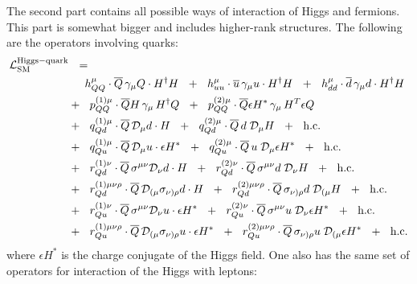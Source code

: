 \documentclass[12pt,preprintnumbers,nofootinbib]{revtex4}
\newcommand{\ov}{\overline}
\newcommand{\md}{\mathcal{D}}
\begin{document}
	The second part contains all possible ways of interaction of
	Higgs and fermions. 
	This part is somewhat bigger and includes higher-rank structures.
	The following are the operators involving quarks:
\begin{align}
\notag
	\mathcal{L}_{\rm SM}^{\rm Higgs-quark} & ~~=~~
	\\
\notag
	&
	\phantom{+~~}
	h_{QQ}^\mu \cdot
	\ov{Q}\, \gamma_\mu Q \cdot H^\dag H ~~+~~
	h_{uu}^\mu \cdot
	\ov{u}\, \gamma_\mu u \cdot H^\dag H ~~+~~
	h_{dd}^\mu \cdot
	\ov{d}\, \gamma_\mu d \cdot H^\dag H 
	\\
\notag
	&
	+~~
	p^{(1)\mu}_{QQ} \cdot
	\ov{Q}H \, \gamma_\mu\, H^\dag Q ~~+~~
	p^{(2)\mu}_{QQ} \cdot
	\ov{Q}\epsilon H^* \, \gamma_\mu \, H^T \epsilon Q 
	\\
\notag
	&
	+~~
	q^{(1)\mu}_{Qd} \cdot
	\ov{Q}\, \md_\mu d\cdot H ~~+~~
	q^{(2)\mu}_{Qd} \cdot
	\ov{Q}\, d \; \md_\mu H ~~+~~
	\text{h.c.}
	\\
\notag
	&
	+~~
	q^{(1)\mu}_{Qu} \cdot
	\ov{Q}\, \md_\mu u \cdot \epsilon H^* ~~+~~
	q^{(2)\mu}_{Qu} \cdot
	\ov{Q}\, u \; \md_\mu \epsilon H^* ~~+~~
	\text{h.c.}
	\\
\notag
	&
	+~~
	r^{(1)\nu}_{Qd} \cdot
	\ov{Q}\, \sigma^{\mu\nu} \md_\nu d \cdot H ~~+~~
	r^{(2)\nu}_{Qd} \cdot
	\ov{Q}\, \sigma^{\mu\nu} d\; \md_\nu H ~~+~~
	\text{h.c.}
	\\
\notag
	&
	+~~
	r^{(1)\mu\nu\rho}_{Qd} \cdot
	\ov{Q}\, \md_{(\mu} \sigma_{\nu)\rho} d \cdot H ~~+~~
	r^{(2)\mu\nu\rho}_{Qd} \cdot
	\ov{Q}\, \sigma_{\nu)\rho} d \; \md_{(\mu} H ~~+~~
	\text{h.c.}
	\\
\notag
	&
	+~~
	r^{(1)\nu}_{Qu} \cdot
	\ov{Q}\, \sigma^{\mu\nu} \md_\nu u \cdot \epsilon H^* ~~+~~
	r^{(2)\nu}_{Qu} \cdot
	\ov{Q}\, \sigma^{\mu\nu} u\; \md_\nu \epsilon H^* ~~+~~
	\text{h.c.}
	\\
\notag
	&
	+~~
	r^{(1)\mu\nu\rho}_{Qu} \cdot
	\ov{Q}\, \md_{(\mu} \sigma_{\nu)\rho} u \cdot \epsilon H^* ~~+~~
	r^{(2)\mu\nu\rho}_{Qu} \cdot
	\ov{Q}\, \sigma_{\nu)\rho} u \; \md_{(\mu} \epsilon H^* ~~+~~
	\text{h.c.}
\end{align}
	where $ \epsilon H^* $ is the charge conjugate of the Higgs field.	
	One also has the same set of operators for interaction of the Higgs 
	with leptons:
\end{document}
